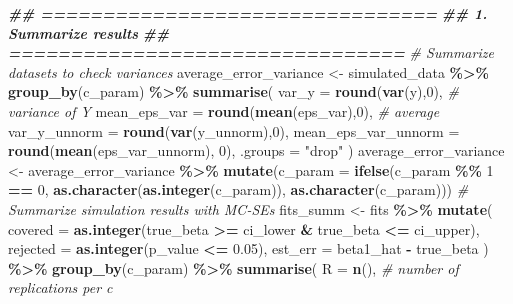 \documentclass[
  twocolumn]{article}
\newenvironment{Shaded}{\begin{snugshade}}{\end{snugshade}}
\newcommand{\AttributeTok}[1]{\textcolor[rgb]{0.13,0.29,0.53}{#1}}
\newcommand{\CommentTok}[1]{\textcolor[rgb]{0.56,0.35,0.01}{\textit{#1}}}
\newcommand{\DecValTok}[1]{\textcolor[rgb]{0.00,0.00,0.81}{#1}}
\newcommand{\DocumentationTok}[1]{\textcolor[rgb]{0.56,0.35,0.01}{\textbf{\textit{#1}}}}
\newcommand{\FloatTok}[1]{\textcolor[rgb]{0.00,0.00,0.81}{#1}}
\newcommand{\FunctionTok}[1]{\textcolor[rgb]{0.13,0.29,0.53}{\textbf{#1}}}
\newcommand{\NormalTok}[1]{#1}
\newcommand{\OtherTok}[1]{\textcolor[rgb]{0.56,0.35,0.01}{#1}}
\newcommand{\SpecialCharTok}[1]{\textcolor[rgb]{0.81,0.36,0.00}{\textbf{#1}}}
\newcommand{\StringTok}[1]{\textcolor[rgb]{0.31,0.60,0.02}{#1}}
\begin{document}
\begin{Shaded}
\begin{Highlighting}[]
\DocumentationTok{\#\# ================================}
\DocumentationTok{\#\# 1. Summarize results}
\DocumentationTok{\#\# ================================}
\CommentTok{\# Summarize datasets to check variances}
\NormalTok{average\_error\_variance }\OtherTok{\textless{}{-}}\NormalTok{ simulated\_data }\SpecialCharTok{\%\textgreater{}\%}
  \FunctionTok{group\_by}\NormalTok{(c\_param) }\SpecialCharTok{\%\textgreater{}\%}
  \FunctionTok{summarise}\NormalTok{(}
    \AttributeTok{var\_y =} \FunctionTok{round}\NormalTok{(}\FunctionTok{var}\NormalTok{(y),}\DecValTok{0}\NormalTok{),                        }\CommentTok{\# variance of Y}
    \AttributeTok{mean\_eps\_var =} \FunctionTok{round}\NormalTok{(}\FunctionTok{mean}\NormalTok{(eps\_var),}\DecValTok{0}\NormalTok{),          }\CommentTok{\# average}
    \AttributeTok{var\_y\_unnorm =} \FunctionTok{round}\NormalTok{(}\FunctionTok{var}\NormalTok{(y\_unnorm),}\DecValTok{0}\NormalTok{),          }
    \AttributeTok{mean\_eps\_var\_unnorm =} \FunctionTok{round}\NormalTok{(}\FunctionTok{mean}\NormalTok{(eps\_var\_unnorm), }\DecValTok{0}\NormalTok{),}
    \AttributeTok{.groups =} \StringTok{"drop"}
\NormalTok{  )}
\NormalTok{average\_error\_variance }\OtherTok{\textless{}{-}}\NormalTok{ average\_error\_variance }\SpecialCharTok{\%\textgreater{}\%}
  \FunctionTok{mutate}\NormalTok{(}\AttributeTok{c\_param =} \FunctionTok{ifelse}\NormalTok{(c\_param }\SpecialCharTok{\%\%} \DecValTok{1} \SpecialCharTok{==} \DecValTok{0}\NormalTok{, }
                          \FunctionTok{as.character}\NormalTok{(}\FunctionTok{as.integer}\NormalTok{(c\_param)), }
                          \FunctionTok{as.character}\NormalTok{(c\_param)))}
\CommentTok{\# Summarize simulation results with MC{-}SEs}
\NormalTok{fits\_summ }\OtherTok{\textless{}{-}}\NormalTok{ fits }\SpecialCharTok{\%\textgreater{}\%}
  \FunctionTok{mutate}\NormalTok{(}
    \AttributeTok{covered   =} \FunctionTok{as.integer}\NormalTok{(true\_beta }\SpecialCharTok{\textgreater{}=}\NormalTok{ ci\_lower }\SpecialCharTok{\&}\NormalTok{ true\_beta }\SpecialCharTok{\textless{}=}\NormalTok{ ci\_upper),}
    \AttributeTok{rejected  =} \FunctionTok{as.integer}\NormalTok{(p\_value }\SpecialCharTok{\textless{}=} \FloatTok{0.05}\NormalTok{),}
    \AttributeTok{est\_err   =}\NormalTok{ beta1\_hat }\SpecialCharTok{{-}}\NormalTok{ true\_beta}
\NormalTok{  ) }\SpecialCharTok{\%\textgreater{}\%}
  \FunctionTok{group\_by}\NormalTok{(c\_param) }\SpecialCharTok{\%\textgreater{}\%}
  \FunctionTok{summarise}\NormalTok{(}
    \AttributeTok{R =} \FunctionTok{n}\NormalTok{(),  }\CommentTok{\# number of replications per c}
    

\end{Highlighting}
\end{Shaded}
\end{document}
